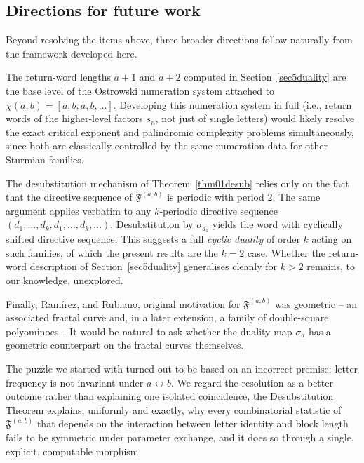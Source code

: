 \documentclass[12pt]{amsart}
\theoremstyle{plain}
\theoremstyle{definition}
\theoremstyle{remark}
\newcommand{\FD}{\mathfrak{F}}
\begin{document}
\subsection{Directions for future work}

Beyond resolving the items above, three broader directions follow
naturally from the framework developed here.

The return-word lengths $a+1$ and $a+2$ computed in
Section~\ref{sec5duality} are the base level of the Ostrowski
numeration system attached to $\chi(a,b)=[a,b,a,b,\ldots]$.
Developing this numeration system in full (i.e., return words of the
higher-level factors $s_n$, not just of single letters) would likely resolve
the exact critical exponent and palindromic complexity problems simultaneously, since both are
classically controlled by the same numeration data for other Sturmian
families.

The desubstitution mechanism of
Theorem~\ref{thm01desub} relies only on the fact that the directive sequence of
$\FD^{(a,b)}$ is periodic with period $2$. The same argument applies
verbatim to any $k$-periodic directive sequence
$(d_1,\ldots,d_k,d_1,\ldots,d_k,\ldots)$. Desubstitution by
$\sigma_{d_1}$ yields the word with cyclically shifted directive sequence.
This suggests a full \emph{cyclic duality} of order $k$ acting on such families, of which the present results are the $k=2$ case. Whether the return-word description of
Section~\ref{sec5duality} generalises cleanly for $k>2$ remains, to our knowledge, unexplored.

Finally, Ram\'irez, and Rubiano, original motivation for $\FD^{(a,b)}$ was geometric -- an
associated fractal curve and, in a later extension, a family of
double-square polyominoes~\cite{FibSnowflake2024}. It would be natural
to ask whether the duality map $\sigma_a$ has a geometric counterpart
on the fractal curves themselves.

The puzzle we started with turned out to be based on an incorrect
premise: letter frequency is not invariant under
$a\leftrightarrow b$. We regard the resolution as a better outcome rather than explaining one isolated coincidence, the
Desubstitution Theorem explains, uniformly and exactly, why every
combinatorial statistic of $\FD^{(a,b)}$ that depends on the interaction
between letter identity and block length fails to be symmetric under
parameter exchange, and it does so through a single, explicit,
computable morphism.

\end{document}
